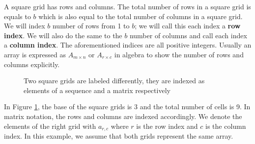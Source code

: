 \documentclass[letterpaper, twoside,12pt]{book}
\begin{document}
    A square grid has rows and columns. The total number of rows in a square grid is equals to $b$ which is also equal to the total number of columns in a square grid. We will index $b$ number of rows from 1 to $b$; we will call this each index a \textbf{row index}. We will also do the same to the $b$ number of columns and call each index a \textbf{column index}. The aforementioned indices are all positive integers. Usually an array is expressed as $A_{m \times n}$ or $A_{r \times c}$ in algebra to show the number of rows and columns explicitly.
    \begin{figure}[ht]
        \centering
        \begin{minipage}{0.45\textwidth}
            \centering
        \end{minipage}
        \begin{minipage}{0.45\textwidth}
            \centering
        \end{minipage}

        \caption{Two square grids are labeled differently, they are indexed as elements of a sequence and a matrix respectively} \label{2forms1grid}
    \end{figure}

    In Figure \ref{2forms1grid}, the base of the square grids is 3 and the total number of cells is 9. In matrix notation, the rows and columns are indexed accordingly. We denote the elements of the right grid with $a_{r,c}$ where $r$ is the row index and $c$ is the column index. In this example, we assume that both grids represent the same array.
\end{document}
